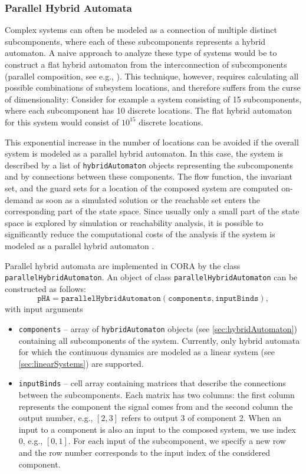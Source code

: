 \subsubsection{Parallel Hybrid Automata} \label{sec:parallelHybridAutomata}

Complex systems can often be modeled as a connection of multiple distinct subcomponents, where each of these subcomponents represents a hybrid automaton. A naive approach to analyze these type of systems would be to construct a flat hybrid automaton from the interconnection of subcomponents (parallel composition, see e.g., \cite[Def.~2.9]{Frehse2005}). This technique, however, requires calculating all possible combinations of subsystem locations, and therefore suffers from the curse of dimensionality: Consider for example a system consisting of 15 subcomponents, where each subcomponent has 10 discrete locations. The flat hybrid automaton for this system would consist of $10^{15}$ discrete locations.

This exponential increase in the number of locations can be avoided if the overall system is modeled as a parallel hybrid automaton. In this case, the system is described by a list of \texttt{hybridAutomaton} objects representing the subcomponents and by connections between these components. The flow function, the invariant set, and the guard sets for a location of the composed system are computed on-demand as soon as a simulated solution or the reachable set enters the corresponding part of the state space. Since usually only a small part of the state space is explored by simulation or reachability analysis, it is possible to significantly reduce the computational costs of the analysis if the system is modeled as a parallel hybrid automaton \cite{Lee2015}. 

Parallel hybrid automata are implemented in CORA by the class \texttt{parallelHybridAutomaton}. An object of class \texttt{parallelHybridAutomaton} can be constructed as follows:
\begin{equation*}
	\texttt{pHA} = \texttt{parallelHybridAutomaton}(\texttt{components},\texttt{inputBinds}),
\end{equation*}
with input arguments 
\begin{itemize}
  \item \texttt{components} -- array of \texttt{hybridAutomaton} objects (see \cref{sec:hybridAutomaton}) containing all subcomponents of the system. Currently, only hybrid automata for which the continuous dynamics are modeled as a linear system (see \cref{sec:linearSystems}) are supported.
  \item \texttt{inputBinds} -- cell array containing matrices that describe the connections between the subcomponents. Each matrix has two columns: the first column represents the component the signal comes from and the second column the output number, e.g., $[2, 3]$ refers to output 3 of component 2. When an input to a component is also an input to the composed system, we use index 0, e.g., $[0,1]$. For each input of the subcomponent, we specify a new row and the row number corresponds to the input index of the considered component. 
\end{itemize}
  
